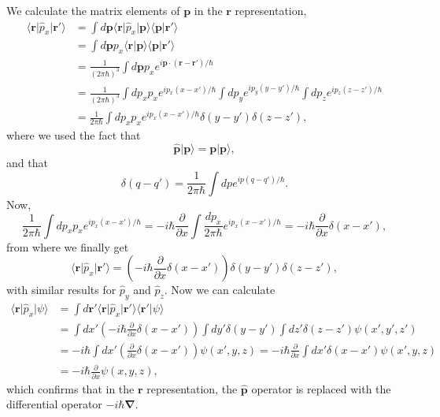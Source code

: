 We calculate the matrix elements of $\mathbf{p}$ in the $\mathbf{r}$
representation,
\begin{align}\label{ap_matp}
\langle\mathbf{r}\vert\hat{p}_x\vert\mathbf{r}'\rangle&=
\int d\mathbf{p}
\langle\mathbf{r}\vert\hat{p}_x\vert\mathbf{p}\rangle\langle\mathbf{p}\vert\mathbf{r}'\rangle \\ \nonumber
&=
\int d\mathbf{p}
p_x\langle\mathbf{r}\vert\mathbf{p}\rangle\langle\mathbf{p}\vert\mathbf{r}'\rangle \\ \nonumber
&=
\frac{1}{(2\pi\hbar)^3}
\int d\mathbf{p}
p_x
e^{i\mathbf{p}\cdot(\mathbf{r}-\mathbf{r}')/\hbar}
\\ \nonumber
&=
\frac{1}{(2\pi\hbar)^3}
\int dp_x
p_x
e^{ip_x(x-x')/\hbar}
\int dp_y
e^{ip_y(y-y')/\hbar}
\int dp_z
e^{ip_z(z-z')/\hbar}
\\ \nonumber
&=
\frac{1}{2\pi\hbar}
\int dp_x
p_x
e^{ip_x(x-x')/\hbar}
\delta(y-y')
\delta(z-z')
,
\end{align}
where we used the fact that
\begin{equation}\label{ap_otra}
\hat{\mathbf{p}}\vert\mathbf{p}\rangle=\mathbf{p}\vert\mathbf{p}\rangle
,
\end{equation}
and that
\begin{equation}\label{ap_delta}
\delta(q-q')=\frac{1}{2\pi\hbar}
\int dp
e^{ip(q-q')/\hbar}
.
\end{equation}
Now,
\begin{equation}\label{ap_mas}
\frac{1}{2\pi\hbar}
\int dp_x
p_x
e^{ip_x(x-x')/\hbar}
=
-i\hbar\frac{\partial}{\partial x}
\int
\frac{dp_x}{2\pi\hbar}
e^{ip_x(x-x')/\hbar}
=-i\hbar\frac{\partial}{\partial x}\delta(x-x')
,
\end{equation}
from where we finally get 
\begin{equation}\label{ap_fin}
\langle\mathbf{r}\vert\hat{p}_x\vert\mathbf{r}'\rangle=
(-i\hbar\frac{\partial}{\partial x}\delta(x-x'))
\delta(y-y')
\delta(z-z')
,
\end{equation}
with similar results for $\hat{p}_y$ and $\hat{p}_z$.
Now we can calculate
\begin{align}\label{ap_psi}
\langle\mathbf{r}\vert\hat{p}_x\vert\psi\rangle&=
\int d\mathbf{r}' \langle\mathbf{r}\vert\hat{p}_x\vert\mathbf{r}'\rangle\langle\mathbf{r}'\vert\psi\rangle
\\ \nonumber
&=
\int dx' (-i\hbar\frac{\partial}{\partial x}\delta(x-x'))
\int dy' \delta(y-y')
\int dz' \delta(z-z')
\psi(x',y',z')
\\ \nonumber
&=
-i\hbar
\int dx' (\frac{\partial}{\partial x}\delta(x-x'))
\psi(x',y,z)
=
-i\hbar
\frac{\partial}{\partial x}
\int dx' 
\delta(x-x')
\psi(x',y,z)
\\ \nonumber
&=
-i\hbar
\frac{\partial}{\partial x}
\psi(x,y,z)
,
\end{align}
which confirms that in the $\mathbf{r}$ representation,
the $\hat{\mathbf{p}}$ operator is replaced with the differential operator
$-i\hbar\boldsymbol{\nabla}$. 

